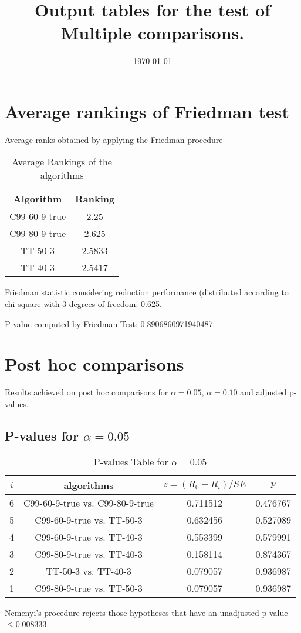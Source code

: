\documentclass[a4paper,10pt]{article}
\title{Output tables for the test of Multiple comparisons.}
\author{}
\date{\today}
\begin{document}
\begin{landscape}
\pagestyle{empty}
\maketitle
\thispagestyle{empty}
\section{Average rankings of Friedman test}



Average ranks obtained by applying the Friedman procedure

\begin{table}[!htp]
\centering
\begin{tabular}{|c|c|}\hline
Algorithm&Ranking\\\hline
C99-60-9-true & 2.25\\
C99-80-9-true & 2.625\\
TT-50-3 & 2.5833\\
TT-40-3 & 2.5417\\
\hline
\end{tabular}
\caption{Average Rankings of the algorithms}
\end{table}

Friedman statistic considering reduction performance (distributed according to chi-square with 3 degrees of freedom: 0.625.

P-value computed by Friedman Test: 0.8906860971940487.\newline



\pagebreak

\section{Post hoc comparisons}

Results achieved on post hoc comparisons for $\alpha = 0.05$, $\alpha = 0.10$ and adjusted p-values.

\subsection{P-values for $\alpha=0.05$}

\begin{table}[!htp]
\centering\scriptsize
\begin{tabular}{cccc}
$i$&algorithms&$z=(R_0 - R_i)/SE$&$p$\\
\hline6&C99-60-9-true vs. C99-80-9-true&0.711512&0.476767\\
5&C99-60-9-true vs. TT-50-3&0.632456&0.527089\\
4&C99-60-9-true vs. TT-40-3&0.553399&0.579991\\
3&C99-80-9-true vs. TT-40-3&0.158114&0.874367\\
2&TT-50-3 vs. TT-40-3&0.079057&0.936987\\
1&C99-80-9-true vs. TT-50-3&0.079057&0.936987\\
\hline
\end{tabular}
\caption{P-values Table for $\alpha=0.05$}
\end{table}Nemenyi's procedure rejects those hypotheses that have an unadjusted p-value $\le0.008333$.


\end{landscape}
\end{document}

